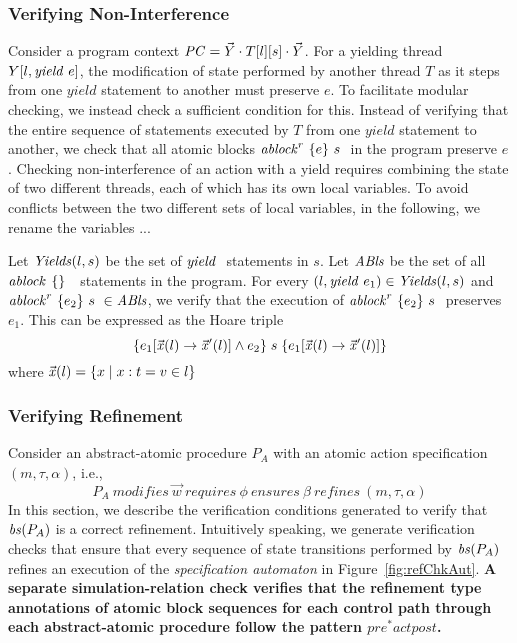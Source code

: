 \subsubsection{Verifying Non-Interference}
Consider a program context $\ProgCtxt = \YieldingThreads \cdot T[\varsL][s] \cdot \YieldingThreads$. For a yielding thread $Y[l, \yield{e}]$, the modification of state performed by another thread $T$ as it steps from one $yield$ statement to another must preserve $e$. To facilitate modular checking, we instead check a sufficient condition for this. Instead of verifying that the entire sequence of statements executed by $T$ from one $yield$ statement to another, we check that all atomic blocks $\ablock{e}{s}{r}$ in the program preserve $e$. Checking non-interference of an action with a yield requires combining the state of two different threads, each of which has its own local variables. To avoid conflicts between the two different sets of local variables, in the following, we rename the variables ...  

Let $\Yields(\varsL,s)$ be the set of $\yield{}$ statements in $s$. Let $\Ablocks$ be the set of all $\ablock{}{}{}$ statements in the program. For every $(l,\yield{e_1}) \in \Yields(\varsL,s)$ and $\ablock{e_2}{s}{r} \in \Ablocks$, we verify that the execution of $\ablock{e_2}{s}{r}$ preserves $e_1$.
This can be expressed as the Hoare triple 
$$\{ e_1[\xs(\varsL) \rightarrow \xs'(\varsL)] \wedge e_2 \} \; s \; \{ e_1[\xs(\varsL) \rightarrow \xs'(\varsL)] \}$$
where $\xs(\varsL) = \{x \mid x:t = v \in \varsL\}$

\subsubsection{Verifying Refinement}
Consider an abstract-atomic procedure $P_{A}$ with an atomic action specification $(m, \tau, \alpha)$, i.e., $$P_{A}\ \mathit{modifies}\ \overrightarrow{w}\ \mathit{requires}\ \phi\ \mathit{ensures}\ \beta\ \mathit{refines}\ (m, \tau, \alpha)$$
In this section, we describe the verification conditions generated to verify that $\bodies(P_{A})$ is a correct refinement. Intuitively speaking, we generate verification checks that ensure that every sequence of state transitions performed by $\bodies(P_{A})$ refines an execution of the {\em specification automaton} in Figure~\ref{fig:refChkAut}. 
{\bf A separate simulation-relation check verifies that the refinement type annotations of atomic block sequences for each control path through each abstract-atomic procedure follow the pattern $\mathit{pre}^* \mathit{act} \mathit{post}$.}

